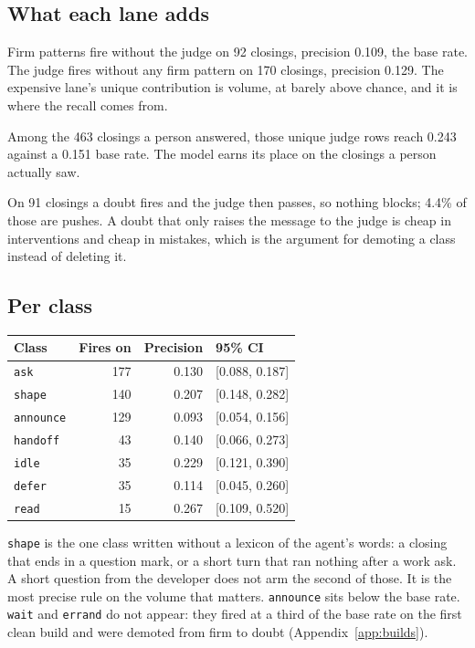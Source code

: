 \subsection{What each lane adds}

Firm patterns fire without the judge on 92 closings, precision 0.109, the
base rate. The judge fires without any firm pattern on 170 closings,
precision 0.129. The expensive lane's unique contribution is volume, at
barely above chance, and it is where the recall comes from.

Among the 463 closings a person answered, those unique judge rows reach
0.243 against a 0.151 base rate. The model earns its place on the closings
a person actually saw.

On 91 closings a doubt fires and the judge then passes, so nothing blocks;
4.4\% of those are pushes. A doubt that only raises the message to the
judge is cheap in interventions and cheap in mistakes, which is the
argument for demoting a class instead of deleting it.

\subsection{Per class}

\begin{center}
\begin{tabular}{lrrl}
\toprule
Class & Fires on & Precision & 95\% CI \\
\midrule
\texttt{ask} & 177 & 0.130 & [0.088, 0.187] \\
\texttt{shape} & 140 & 0.207 & [0.148, 0.282] \\
\texttt{announce} & 129 & 0.093 & [0.054, 0.156] \\
\texttt{handoff} & 43 & 0.140 & [0.066, 0.273] \\
\texttt{idle} & 35 & 0.229 & [0.121, 0.390] \\
\texttt{defer} & 35 & 0.114 & [0.045, 0.260] \\
\texttt{read} & 15 & 0.267 & [0.109, 0.520] \\
\bottomrule
\end{tabular}
\end{center}

\texttt{shape} is the one class written without a lexicon of the agent's
words: a closing that ends in a question mark, or a short turn that ran
nothing after a work ask. A short question from the developer does not
arm the second of those. It is the most precise rule on the volume that
matters. \texttt{announce} sits below the
base rate. \texttt{wait} and \texttt{errand} do not appear: they fired at
a third of the base rate on the first clean build and were demoted from
firm to doubt (Appendix~\ref{app:builds}).

